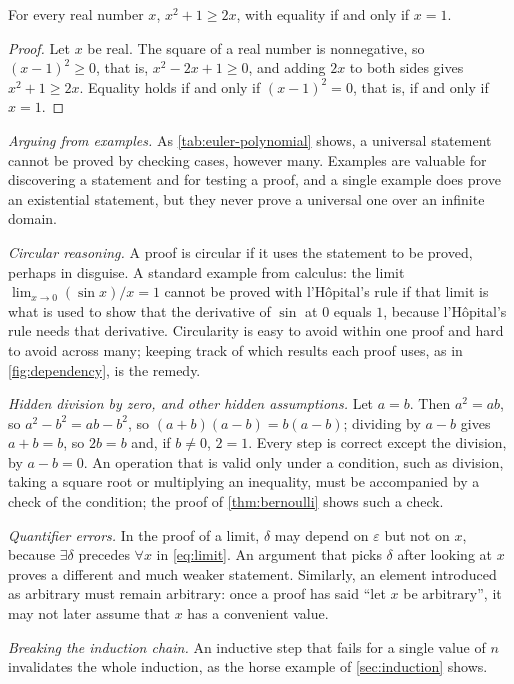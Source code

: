 \begin{proposition}
\label{prop:amgm-simple}
For every real number $x$, $x^2+1\ge2x$, with equality if and only if $x=1$.
\end{proposition}

\begin{proof}
Let $x$ be real. The square of a real number is nonnegative, so $(x-1)^2\ge0$, that is, $x^2-2x+1\ge0$, and adding $2x$ to both sides gives $x^2+1\ge2x$. Equality holds if and only if $(x-1)^2=0$, that is, if and only if $x=1$.
\end{proof}

\emph{Arguing from examples.} As \cref{tab:euler-polynomial} shows, a universal statement cannot be proved by checking cases, however many. Examples are valuable for discovering a statement and for testing a proof, and a single example does prove an existential statement, but they never prove a universal one over an infinite domain.

\emph{Circular reasoning.} A proof is circular if it uses the statement to be proved, perhaps in disguise. A standard example from calculus: the limit $\lim_{x\to0}(\sin x)/x=1$ cannot be proved with l'H\^opital's rule if that limit is what is used to show that the derivative of $\sin$ at $0$ equals $1$, because l'H\^opital's rule needs that derivative. Circularity is easy to avoid within one proof and hard to avoid across many; keeping track of which results each proof uses, as in \cref{fig:dependency}, is the remedy.

\emph{Hidden division by zero, and other hidden assumptions.} Let $a=b$. Then $a^2=ab$, so $a^2-b^2=ab-b^2$, so $(a+b)(a-b)=b(a-b)$; dividing by $a-b$ gives $a+b=b$, so $2b=b$ and, if $b\ne0$, $2=1$. Every step is correct except the division, by $a-b=0$. An operation that is valid only under a condition, such as division, taking a square root or multiplying an inequality, must be accompanied by a check of the condition; the proof of \cref{thm:bernoulli} shows such a check.

\emph{Quantifier errors.} In the proof of a limit, $\delta$ may depend on $\varepsilon$ but not on $x$, because $\exists\delta$ precedes $\forall x$ in \eqref{eq:limit}. An argument that picks $\delta$ after looking at $x$ proves a different and much weaker statement. Similarly, an element introduced as arbitrary must remain arbitrary: once a proof has said ``let $x$ be arbitrary'', it may not later assume that $x$ has a convenient value.

\emph{Breaking the induction chain.} An inductive step that fails for a single value of $n$ invalidates the whole induction, as the horse example of \cref{sec:induction} shows.

